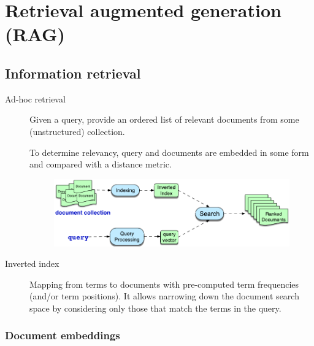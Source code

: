 \chapter{Retrieval augmented generation (RAG)}



\section{Information retrieval}

\begin{description}
    \item[Ad-hoc retrieval] 
        Given a query, provide an ordered list of relevant documents from some (unstructured) collection.

        To determine relevancy, query and documents are embedded in some form and compared with a distance metric.

        \begin{figure}[H]
            \centering
            \includegraphics[width=0.75\linewidth]{./img/_info_retrieval.pdf}
        \end{figure}

    \item[Inverted index] 
        Mapping from terms to documents with pre-computed term frequencies (and/or term positions). It allows narrowing down the document search space by considering only those that match the terms in the query.
\end{description}


\subsection{Document embeddings}

